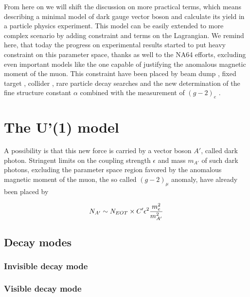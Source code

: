 From here on we will shift the discussion on more practical terms, which means describing a minimal model of dark gauge vector boson and calculate its yield in a particle physics experiment. This model can be easily extended to more complex scenario by adding constraint and terms on the Lagrangian. We remind here, that today the progress on experimental results started to put heavy constraint on this parameter space, thanks as well to the NA64 efforts, excluding even important models like the one capable of justifying the anomalous magnetic moment of the muon. This constraint have been placed by beam dump \cite{jdb, charm, rio, e137, konaka, bross, dav,  ath, nomad, e787, essig1, blum,sg1, blum1, sarah1}, fixed target \cite{apex,merkel,merkel1}, collider \cite{babar, curt, babar1}, rare particle decay searches \cite{sindrum, kloe, sg2, kloe2, wasa, hades, phenix, e949, na48, pol, kloe3} and the new determination of the fine structure constant $\alpha$ combined with the measurement of $(g-2)_e$ \cite{Parker191,PhysRevLett.100.120801}.

\section{The U'(1) model}
\label{ch1:sec:dm-u1model}

A possibility is that this new force is carried by a vector boson $A'$, called dark photon.
Stringent limits on the coupling strength $\epsilon$ and mass $m_{A'}$ of such dark photons, excluding the parameter space region favored by the anomalous magnetic moment of the muon, the so called $(g-2)_{\mu}$ anomaly, have already been placed by 

\begin{equation}
  \label{eq:dm-rate}
  N_{A'} \sim N_{EOT} \times C' \epsilon^2 \frac{m_e^2}{m^2_{A'}}
\end{equation}

\subsection{Decay modes}
\label{ch1:sec:dm-decay}

\subsubsection{Invisible decay mode}
\label{ch1:sec:dm-decay-invis}

\subsubsection{Visible decay mode}
\label{ch1:sec:dm-decay-vis}


